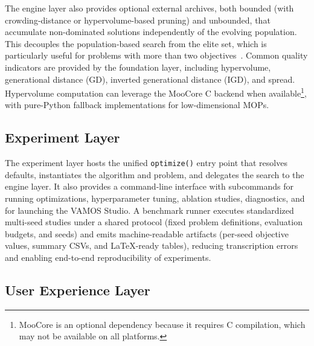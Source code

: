 \documentclass[final,5p,times,twocolumn]{elsarticle}
\begin{document}
The engine layer also provides optional external archives, both bounded (with crowding-distance or hypervolume-based pruning) and unbounded, that accumulate non-dominated solutions independently of the evolving population. This decouples the population-based search from the elite set, which is particularly useful for problems with more than two objectives~\cite{IPS20}. Common quality indicators are provided by the foundation layer, including hypervolume, generational distance (GD), inverted generational distance (IGD), and spread. Hypervolume computation can leverage the MooCore C backend when available\footnote{MooCore is an optional dependency because it requires C compilation, which may not be available on all platforms.}, with pure-Python fallback implementations for low-dimensional MOPs.

\subsection{Experiment Layer}

The experiment layer hosts the unified \texttt{optimize()} entry point that resolves defaults, instantiates the algorithm and problem, and delegates the search to the engine layer. It also provides a command-line interface with subcommands for running optimizations, hyperparameter tuning, ablation studies, diagnostics, and for launching the VAMOS Studio. A benchmark runner executes standardized multi-seed studies under a shared protocol (fixed problem definitions, evaluation budgets, and seeds) and emits machine-readable artifacts (per-seed objective values, summary CSVs, and LaTeX-ready tables), reducing transcription errors and enabling end-to-end reproducibility of experiments.

\subsection{User Experience Layer}
\end{document}
